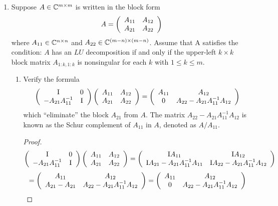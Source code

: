 \documentclass{article}
\begin{document}
\begin{enumerate}
\item Suppose $A \in \mathbb{C}^{m \times m}$ is written in the block form
\[
A = \left(\begin{array}{c c}
        A_{11} & A_{12}\\
        A_{21} & A_{22}
    \end{array}\right)
\]
where $A_{11} \in \mathbb{C}^{n\times n}$ and $A_{22} \in \mathbb{C}^{(m-n)\times(m-n)}$. Assume that A satisfies the condition: $A$ has an $LU$ decomposition if and only if the upper-left $k\times k$ block matrix $A_{1:k,1:k}$ is nonsingular for each $k$ with $1 \le k \le m$.
\begin{enumerate}
\item Verify the formula
\[
 \left(\begin{array}{c c}
        \mathrm{I} & 0\\
        -A_{21}A_{11}^{-1} & \mathrm{I}
    \end{array}\right)
 \left(\begin{array}{c c}
        A_{11} & A_{12}\\
        A_{21} & A_{22}
    \end{array}\right) =  \left(\begin{array}{c c}
        A_{11} & A_{12}\\
        0 & A_{22} - A_{21}A_{11}^{-1}A_{12}
    \end{array}\right)
\]
which “eliminate” the block $A_{21}$ from $A$. The matrix $A_{22}-A_{21}A_{11}^{-1}A_{12}$ is known as the Schur complement of $A_{11}$ in $A$, denoted as $A/A_{11}$.

\begin{proof}

\[
 \left(\begin{array}{c c}
        \mathrm{I} & 0\\
        -A_{21}A_{11}^{-1} & \mathrm{I}
    \end{array}\right)
 \left(\begin{array}{c c}
        A_{11} & A_{12}\\
        A_{21} & A_{22}
    \end{array}\right) =  \left(\begin{array}{c c}
        \mathrm{I} A_{11} & \mathrm{I} A_{12}\\
        \mathrm{I} A_{21} - A_{21}A_{11}^{-1}A_{11} & \mathrm{I} A_{22} - A_{21}A_{11}^{-1}A_{12}
    \end{array}\right)
\]
\[
    =  \left(\begin{array}{c c}
            A_{11} & A_{12}\\
            A_{21} - A_{21} & A_{22} - A_{21}A_{11}^{-1}A_{12}
        \end{array}\right) =  \left(\begin{array}{c c}
            A_{11} & A_{12}\\
            0  & A_{22} - A_{21}A_{11}^{-1}A_{12}
        \end{array}\right) 
\]


\end{proof}
\end{enumerate}
\end{enumerate}
\end{document}
